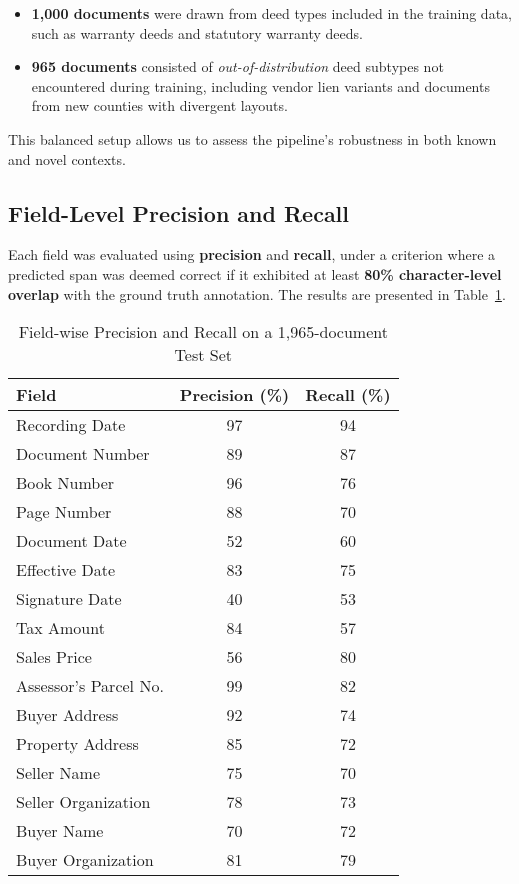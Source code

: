 \documentclass{article}
\begin{document}
\begin{itemize}
    \item \textbf{1,000 documents} were drawn from deed types included in the training data, such as warranty deeds and statutory warranty deeds.
    \item \textbf{965 documents} consisted of \textit{out-of-distribution} deed subtypes not encountered during training, including vendor lien variants and documents from new counties with divergent layouts.
\end{itemize}

This balanced setup allows us to assess the pipeline's robustness in both known and novel contexts.

\subsection{Field-Level Precision and Recall}

Each field was evaluated using \textbf{precision} and \textbf{recall}, under a criterion where a predicted span was deemed correct if it exhibited at least \textbf{80\% character-level overlap} with the ground truth annotation. The results are presented in Table~\ref{tab:field_metrics}.

\begin{table}[H]
\centering
\renewcommand{\arraystretch}{1.2}
\begin{tabular}{|l|c|c|}
\hline
\textbf{Field} & \textbf{Precision (\%)} & \textbf{Recall (\%)} \\
\hline
Recording Date       & 97 & 94 \\
Document Number      & 89 & 87 \\
Book Number          & 96 & 76 \\
Page Number          & 88 & 70 \\
Document Date        & 52 & 60 \\
Effective Date       & 83 & 75 \\
Signature Date       & 40 & 53 \\
Tax Amount           & 84 & 57 \\
Sales Price          & 56 & 80 \\
Assessor's Parcel No.& 99 & 82 \\
Buyer Address        & 92 & 74 \\
Property Address     & 85 & 72 \\
Seller Name          & 75 & 70 \\
Seller Organization  & 78 & 73 \\
Buyer Name           & 70 & 72 \\
Buyer Organization   & 81 & 79 \\
\hline
\end{tabular}
\caption{Field-wise Precision and Recall on a 1,965-document Test Set}
\label{tab:field_metrics}
\end{table}
\end{document}
